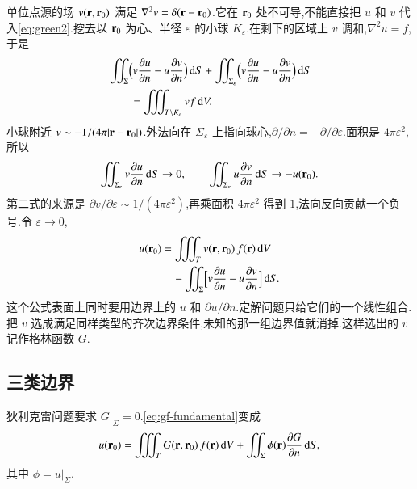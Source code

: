 单位点源的场 $v({\mathbf{r}},{\mathbf{r}}_0)$ 满足 $\nabla^2 v=\delta({\mathbf{r}}-{\mathbf{r}}_0)$.它在 ${\mathbf{r}}_0$ 处不可导,不能直接把 $u$ 和 $v$ 代入\eqref{eq:green2}.挖去以 ${\mathbf{r}}_0$ 为心、半径 $\varepsilon$ 的小球 $K_{\varepsilon}$.在剩下的区域上 $v$ 调和,$\nabla^2 u=f$,于是
\begin{equation}
\begin{aligned}
  &\iint_{\Sigma}\Bigl(v\frac{\partial u}{\partial n}-u\frac{\partial v}{\partial n}\Bigr)\,\mathrm{d}S
  +\iint_{\Sigma_{\varepsilon}}\Bigl(v\frac{\partial u}{\partial n}-u\frac{\partial v}{\partial n}\Bigr)\,\mathrm{d}S \\
  &\qquad=\iiint_{T\setminus K_{\varepsilon}} v f\,\mathrm{d}V.
\end{aligned}
\end{equation}
小球附近 $v\sim -1/(4\pi|{\mathbf{r}}-{\mathbf{r}}_0|)$.外法向在 $\Sigma_{\varepsilon}$ 上指向球心,$\partial/\partial n=-\partial/\partial\varepsilon$.面积是 $4\pi\varepsilon^2$,所以
\begin{equation}
  \iint_{\Sigma_{\varepsilon}} v\frac{\partial u}{\partial n}\,\mathrm{d}S\to 0,
  \qquad
  \iint_{\Sigma_{\varepsilon}} u\frac{\partial v}{\partial n}\,\mathrm{d}S\to -u({\mathbf{r}}_0).
\end{equation}
第二式的来源是 $\partial v/\partial\varepsilon\sim 1/(4\pi\varepsilon^2)$,再乘面积 $4\pi\varepsilon^2$ 得到 $1$,法向反向贡献一个负号.令 $\varepsilon\to 0$,
\begin{equation}
\begin{aligned}
  u({\mathbf{r}}_0)
  &=\iiint_{T} v({\mathbf{r}},{\mathbf{r}}_0)\,f({\mathbf{r}})\,\mathrm{d}V \\
  &\quad-\iint_{\Sigma}\Bigl[
      v\frac{\partial u}{\partial n}-u\frac{\partial v}{\partial n}
    \Bigr]\,\mathrm{d}S.
\end{aligned}
\label{eq:gf-fundamental}
\end{equation}
这个公式表面上同时要用边界上的 $u$ 和 $\partial u/\partial n$.定解问题只给它们的一个线性组合.把 $v$ 选成满足同样类型的齐次边界条件,未知的那一组边界值就消掉.这样选出的 $v$ 记作格林函数 $G$.

\subsection{三类边界}
狄利克雷问题要求 $G|_{\Sigma}=0$.\eqref{eq:gf-fundamental}变成
\begin{equation}
  u({\mathbf{r}}_0)
  =\iiint_{T} G({\mathbf{r}},{\mathbf{r}}_0)\,f({\mathbf{r}})\,\mathrm{d}V
  +\iint_{\Sigma}\phi({\mathbf{r}})\frac{\partial G}{\partial n}\,\mathrm{d}S,
  \label{eq:gf-dirichlet}
\end{equation}
其中 $\phi=u|_{\Sigma}$.

